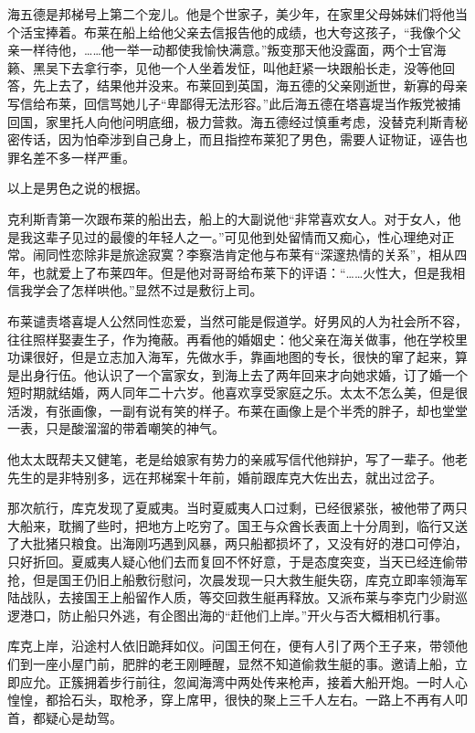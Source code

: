 \par 海五德是邦梯号上第二个宠儿。他是个世家子，美少年，在家里父母姊妹们将他当个活宝捧着。布莱在船上给他父亲去信报告他的成绩，也大夸这孩子，“我像个父亲一样待他，……他一举一动都使我愉快满意。”叛变那天他没露面，两个士官海籁、黑吴下去拿行李，见他一个人坐着发怔，叫他赶紧一块跟船长走，没等他回答，先上去了，结果他并没来。布莱回到英国，海五德的父亲刚逝世，新寡的母亲写信给布莱，回信骂她儿子“卑鄙得无法形容。”此后海五德在塔喜堤当作叛党被捕回国，家里托人向他问明底细，极力营救。海五德经过慎重考虑，没替克利斯青秘密传话，因为怕牵涉到自己身上，而且指控布莱犯了男色，需要人证物证，诬告也罪名差不多一样严重。
\par 以上是男色之说的根据。
\par 克利斯青第一次跟布莱的船出去，船上的大副说他“非常喜欢女人。对于女人，他是我这辈子见过的最傻的年轻人之一。”可见他到处留情而又痴心，性心理绝对正常。闹同性恋除非是旅途寂寞？李察浩肯定他与布莱有“深邃热情的关系”，相从四年，也就爱上了布莱四年。但是他对哥哥给布莱下的评语：“……火性大，但是我相信我学会了怎样哄他。”显然不过是敷衍上司。
\par 布莱谴责塔喜堤人公然同性恋爱，当然可能是假道学。好男风的人为社会所不容，往往照样娶妻生子，作为掩蔽。再看他的婚姻史：他父亲在海关做事，他在学校里功课很好，但是立志加入海军，先做水手，靠画地图的专长，很快的窜了起来，算是出身行伍。他认识了一个富家女，到海上去了两年回来才向她求婚，订了婚一个短时期就结婚，两人同年二十六岁。他喜欢享受家庭之乐。太太不怎么美，但是很活泼，有张画像，一副有说有笑的样子。布莱在画像上是个半秃的胖子，却也堂堂一表，只是酸溜溜的带着嘲笑的神气。
\par 他太太既帮夫又健笔，老是给娘家有势力的亲戚写信代他辩护，写了一辈子。他老先生的是非特别多，远在邦梯案十年前，婚前跟库克大佐出去，就出过岔子。
\par 那次航行，库克发现了夏威夷。当时夏威夷人口过剩，已经很紧张，被他带了两只大船来，耽搁了些时，把地方上吃穷了。国王与众酋长表面上十分周到，临行又送了大批猪只粮食。出海刚巧遇到风暴，两只船都损坏了，又没有好的港口可停泊，只好折回。夏威夷人疑心他们去而复回不怀好意，于是态度突变，当天已经连偷带抢，但是国王仍旧上船敷衍慰问，次晨发现一只大救生艇失窃，库克立即率领海军陆战队，去接国王上船留作人质，等交回救生艇再释放。又派布莱与李克门少尉巡逻港口，防止船只外逃，有企图出海的“赶他们上岸。”开火与否大概相机行事。
\par 库克上岸，沿途村人依旧跪拜如仪。问国王何在，便有人引了两个王子来，带领他们到一座小屋门前，肥胖的老王刚睡醒，显然不知道偷救生艇的事。邀请上船，立即应允。正簇拥着步行前往，忽闻海湾中两处传来枪声，接着大船开炮。一时人心惶惶，都拾石头，取枪矛，穿上席甲，很快的聚上三千人左右。一路上不再有人叩首，都疑心是劫驾。
